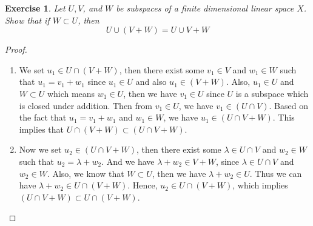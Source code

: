 \documentclass[11pt]{book}
\newtheorem{exercise}{Exercise}[section]
\theoremstyle{definition}
\numberwithin{equation}{subsection}
\begin{document}
\medskip

\begin{exercise}\label{ex_3}
Let $U, V$, and $W$ be subspaces of a finite dimensional linear space $X$. Show that if $W\subset U$, then 
$$U\cup (V + W) = U\cup V + W$$
\end{exercise}
\begin{proof}
~\begin{enumerate}[label=(\arabic*)]
    \item We set $u_1 \in U \cap (V+W)$, then there exist some $v_1 \in V$ and $w_1 \in W$ such that $u_1 = v_1 + w_1$ since $u_1 \in U$ and also $u_1 \in (V+W)$. Also, $u_1 \in U$ and $W \subset U$ which means $w_1 \in U$, then we have $v_1 \in U$ since $U$ is a subspace which is closed under addition. Then from $v_1 \in U$, we have $v_1 \in (U \cap V)$. Based on the fact that $u_1 = v_1 + w_1$ and $w_1 \in W$, we have $u_1 \in (U \cap V + W)$. This implies that $U \cap (V+W) \subset (U \cap V + W)$.
    \item Now we set $u_2 \in (U \cap V + W)$, then there exist some $\lambda \in U \cap V$ and $w_2 \in W$ such that $u_2 = \lambda + w_2$. And we have $\lambda + w_2 \in V+W$, since $\lambda \in U \cap V$ and $w_2 \in W$. Also, we know that $W \subset U$, then we have $\lambda + w_2 \in U$. Thus we can have $\lambda + w_2 \in U \cap (V+W)$. Hence, $u_2 \in U \cap (V+W)$, which implies $(U \cap V + W) \subset U \cap (V+W)$.
\end{enumerate}
\end{proof}

\medskip
\end{document}
